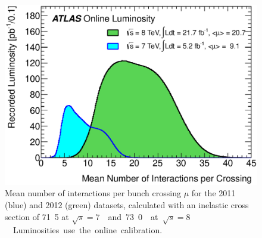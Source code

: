 \begin{figure}[h]
	\includegraphics[width=\mediumfigwidth]{tex/experiment/pileup}
	\caption{Mean number of interactions per bunch crossing $\mu$ for the 2011 (blue) and 
	2012 (green) datasets, calculated with an inelastic \pp cross section of 
	\unit{71.5}{\milli\barn} at \unit{$\sqrt{s} = 7$}{\TeV} and 
	\unit{73.0}{\milli\barn} at \unit{$\sqrt{s} = 8$}{\TeV}.
	Luminosities use the online calibration.}
	\label{fig:pileup}
\end{figure}

